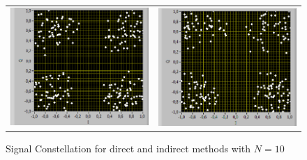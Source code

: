 \documentclass{article}
\begin{document}
        \begin{figure}[h]
        \centering
        \begin{tabular}{c c}
        \includegraphics[width = 0.4 \textwidth]{10_10_dir.PNG} & \includegraphics[width = 0.4 \textwidth]{10_10_indir.PNG}\\
        \end{tabular}
        \caption{Signal Constellation for direct and indirect methods with $N=10$ \label{N10}}
        \end{figure}
\end{document}
